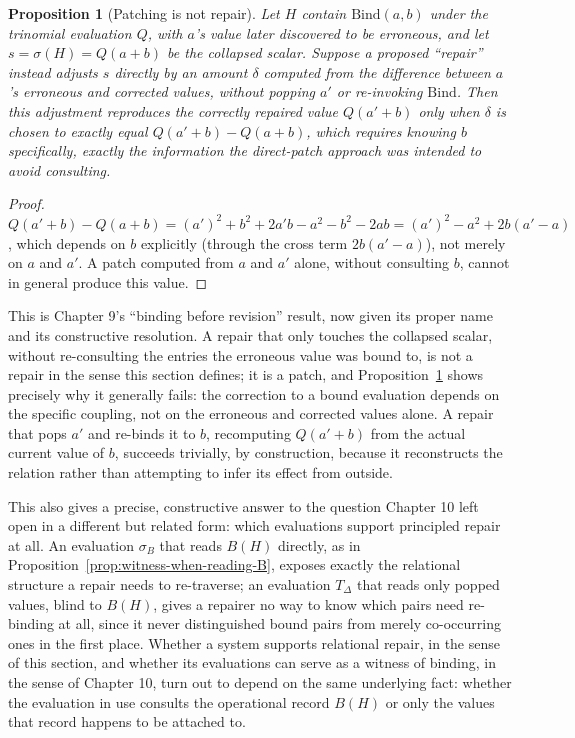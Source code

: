\documentclass[11pt]{book}
\newtheorem{proposition}[theorem]{Proposition}
\begin{document}
\begin{proposition}[Patching is not repair]
\label{prop:patch-not-repair}
Let $H$ contain $\mathrm{Bind}(a,b)$ under the trinomial evaluation $Q$, with $a$'s value later discovered to be erroneous, and let $s=\sigma(H)=Q(a+b)$ be the collapsed scalar. Suppose a proposed ``repair'' instead adjusts $s$ directly by an amount $\delta$ computed from the difference between $a$'s erroneous and corrected values, without popping $a'$ or re-invoking $\mathrm{Bind}$. Then this adjustment reproduces the correctly repaired value $Q(a'+b)$ only when $\delta$ is chosen to exactly equal $Q(a'+b)-Q(a+b)$, which requires knowing $b$ specifically, exactly the information the direct-patch approach was intended to avoid consulting.
\end{proposition}
\begin{proof}
$Q(a'+b)-Q(a+b) = (a')^2+b^2+2a'b - a^2-b^2-2ab = (a')^2-a^2+2b(a'-a)$, which depends on $b$ explicitly (through the cross term $2b(a'-a)$), not merely on $a$ and $a'$. A patch computed from $a$ and $a'$ alone, without consulting $b$, cannot in general produce this value.
\end{proof}

This is Chapter 9's ``binding before revision'' result, now given its proper name and its constructive resolution. A repair that only touches the collapsed scalar, without re-consulting the entries the erroneous value was bound to, is not a repair in the sense this section defines; it is a patch, and Proposition~\ref{prop:patch-not-repair} shows precisely why it generally fails: the correction to a bound evaluation depends on the specific coupling, not on the erroneous and corrected values alone. A repair that pops $a'$ and re-binds it to $b$, recomputing $Q(a'+b)$ from the actual current value of $b$, succeeds trivially, by construction, because it reconstructs the relation rather than attempting to infer its effect from outside.

This also gives a precise, constructive answer to the question Chapter 10 left open in a different but related form: which evaluations support principled repair at all. An evaluation $\sigma_B$ that reads $B(H)$ directly, as in Proposition~\ref{prop:witness-when-reading-B}, exposes exactly the relational structure a repair needs to re-traverse; an evaluation $T_\Delta$ that reads only popped values, blind to $B(H)$, gives a repairer no way to know which pairs need re-binding at all, since it never distinguished bound pairs from merely co-occurring ones in the first place. Whether a system supports relational repair, in the sense of this section, and whether its evaluations can serve as a witness of binding, in the sense of Chapter 10, turn out to depend on the same underlying fact: whether the evaluation in use consults the operational record $B(H)$ or only the values that record happens to be attached to.
\end{document}
